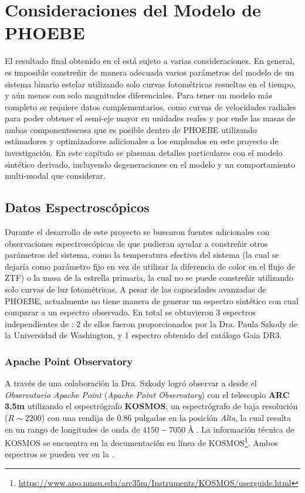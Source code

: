 \chapter{Consideraciones del Modelo de PHOEBE} \label{conclusion:consideraciones_phoebe}

El resultado final obtenido en el
 está sujeto a varias
consideraciones. En general, es imposible constreñir de manera adecuada varios
parámetros del modelo de un sistema binario estelar utilizando solo curvas
fotométricas resueltas en el tiempo, y aún menos con solo magnitudes
diferenciales. Para tener un modelo más completo se requiere datos
complementarios, como curvas de velocidades radiales para poder obtener el
semi-eje mayor en unidades reales y por ende las masas de ambas
componentes\textemdash cosa que es posible dentro de PHOEBE utilizando
estimadores y optimizadores adicionales a los empleados en este proyecto de
investigación. En este capítulo se plasman detalles particulares con el modelo
sintético derivado, incluyendo degeneraciones en el modelo y un comportamiento
multi-modal que considerar.

\section{Datos Espectroscópicos}

Durante el desarrollo de este proyecto se buscaron fuentes adicionales con 
observaciones espectroscópicas de \atoObjId que pudieran ayudar a
constreñir otros parámetros del sistema, como la temperatura efectiva del
sistema (la cual se dejaría como parámetro fijo en vez de utilizar la diferencia
de color en el flujo de ZTF) o la masa de la estrella primaria, la cual no se
puede constreñir utilizando solo curvas de luz fotométricas. A pesar de las
capacidades avanzadas de PHOEBE, actualmente no tiene manera de generar un
espectro sintético con cual comparar a un espectro observado. En total se
obtuvieron 3 espectros independientes de \atoObjIdNoSpace : 2 de ellos fueron
proporcionados por la Dra. Paula Szkody de la Universidad de Washington, y 1
espectro obtenido del catálogo Gaia DR3.

\subsection{Apache Point Observatory}

A través de una colaboración la Dra. Szkody logró observar a \atoObjId desde el
\textit{Observatorio Apache Point} (\textit{Apache Point Observatory}) con el
telescopio \textbf{ARC 3.5m} utilizando el espectrógrafo \textbf{KOSMOS}, un
espectrógrafo de baja resolución ($R \sim 2200$) con una rendija de 0.86
pulgadas en la posición \textit{Alta}, la cual resulta en un rango de longitudes
de onda de $4150 - 7050 \Angstrom$. La información técnica de KOSMOS se
encuentra en la documentación en línea de
KOSMOS\footnote{\url{https://www.apo.nmsu.edu/arc35m/Instruments/KOSMOS/userguide.html}}.
Ambos espectros se pueden ver en la .

